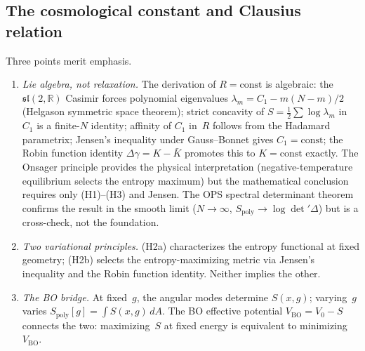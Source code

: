 \subsection{The cosmological constant and Clausius relation}

\begin{remark}
\label{rem:H2-structure}
Three points merit emphasis.
\begin{enumerate}
\item \emph{Lie algebra, not relaxation.}
  The derivation of $R = \mathrm{const}$ is algebraic:
  the $\mathfrak{sl}(2,\mathbb{R})$ Casimir forces
  polynomial eigenvalues $\lambda_m = C_1 - m(N{-}m)/2$
  (Helgason symmetric space theorem);
  strict concavity of $S = \tfrac{1}{2}\sum\log\lambda_m$
  in~$C_1$ is a finite-$N$ identity;
  affinity of $C_1$ in~$R$ follows from the Hadamard parametrix;
  Jensen's inequality under Gauss--Bonnet gives $C_1 = \mathrm{const}$;
  the Robin function identity $\Delta\gamma = K - \bar{K}$
  promotes this to $K = \mathrm{const}$ exactly.
  The Onsager principle provides the physical interpretation
  (negative-temperature equilibrium selects the entropy maximum)
  but the mathematical conclusion requires only
  (H1)--(H3) and Jensen.
  The OPS spectral determinant theorem
  \citep{OsgoodPhillipsSarnak1988} confirms the result
  in the smooth limit ($N \to \infty$,
  $S_{\mathrm{poly}} \to \log\det'\Delta$)
  but is a cross-check, not the foundation.
\item \emph{Two variational principles.}
  (H2a) characterizes the entropy functional at fixed geometry;
  (H2b) selects the entropy-maximizing metric via Jensen's
  inequality and the Robin function identity.
  Neither implies the other.
\item \emph{The BO bridge.}
  At fixed~$g$, the angular modes determine $S(x,g)$;
  varying~$g$ varies $S_{\mathrm{poly}}[g] = \int S(x,g)\,dA$.
  The BO effective potential $V_{\mathrm{BO}} = V_0 - S$
  connects the two: maximizing~$S$ at fixed energy is
  equivalent to minimizing $V_{\mathrm{BO}}$.
\end{enumerate}
\end{remark}

